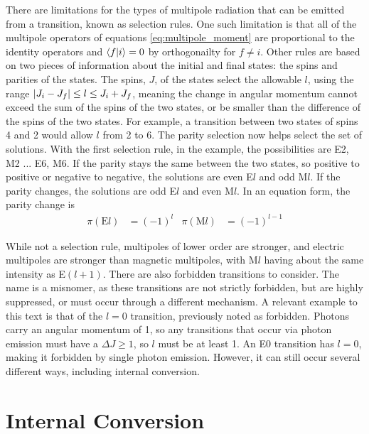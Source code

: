 There are limitations for the types of multipole radiation that can be emitted from a transition, known as selection rules. One such limitation is that all of the multipole operators of equations \ref{eq:multipole_moment} are proportional to the identity operators and $\bra{f}\ket{i}=0$ by orthogonailty for $f\ne i$. Other rules are based on two pieces of information about the initial and final states: the spins and parities of the states. The spins, $J$, of the states select the allowable $l$, using the range $\abs{J_i-J_f}\leq l\leq J_i+J_f$, meaning the change in angular momentum cannot exceed the sum of the spins of the two states, or be smaller than the difference of the spins of the two states. For example, a transition between two states of spins 4 and 2 would allow $l$ from 2 to 6. The parity selection now helps select the set of solutions. With the first selection rule, in the example, the possibilities are E2, M2 ... E6, M6. If the parity stays the same between the two states, so positive to positive or negative to negative, the solutions are even E$l$ and odd M$l$. If the parity changes, the solutions are odd E$l$ and even M$l$. In an equation form, the parity change is
\begin{align}
    \pi(\text{E}l) &= (-1)^{l} & \pi(\text{M}l) &= (-1)^{l-1}
\end{align}

While not a selection rule, multipoles of lower order are stronger, and electric multipoles are stronger than magnetic multipoles, with M$l$ having about the same intensity as E$(l+1)$. There are also forbidden transitions to consider. The name is a misnomer, as these transitions are not strictly forbidden, but are highly suppressed, or must occur through a different mechanism. A relevant example to this text is that of the $l=0$ transition, previously noted as forbidden. Photons carry an angular momentum of 1, so any transitions that occur via photon emission must have a $\Delta J \geq 1$, so $l$ must be at least 1. An E0 transition has $l=0$, making it forbidden by single photon emission. However, it can still occur several different ways, including internal conversion.

\section{Internal Conversion}

